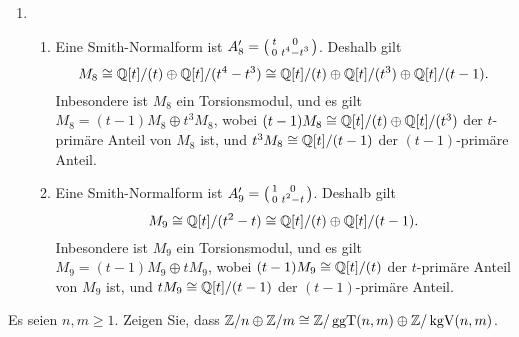 \begin{solution}
\begin{enumerate}
\begin{enumerate}
      \end{enumerate}
    \item
      \begin{enumerate}
        \item
          Eine Smith-Normalform ist $A_8' = \begin{psmallmatrix} t & 0 \\ 0 & t^4-t^3 \end{psmallmatrix}$.
          Deshalb gilt
          \[
                  M_8
            \cong \mathbb{Q}[t]/(t) \oplus \mathbb{Q}[t]/(t^4 - t^3)
            \cong \mathbb{Q}[t]/(t)  \oplus \mathbb{Q}[t]/(t^3) \oplus \mathbb{Q}[t]/(t-1).
          \]
          Inbesondere ist $M_8$ ein Torsionsmodul, und es gilt $M_8 = (t-1) M_8 \oplus t^3 M_8$, wobei $(t-1) M_8 \cong \mathbb{Q}[t]/(t) \oplus \mathbb{Q}[t]/(t^3)$ der $t$-primäre Anteil von $M_8$ ist, und $t^3 M_8 \cong \mathbb{Q}[t]/(t-1)$ der $(t-1)$-primäre Anteil.
        \item
          Eine Smith-Normalform ist $A_9' = \begin{psmallmatrix} 1 & 0 \\ 0 & t^2 - t \end{psmallmatrix}$.
          Deshalb gilt
          \[
                  M_9
            \cong \mathbb{Q}[t]/(t^2 - t)
            \cong \mathbb{Q}[t]/(t) \oplus \mathbb{Q}[t]/(t-1).
          \]
          Inbesondere ist $M_9$ ein Torsionsmodul, und es gilt $M_9 = (t-1) M_9 \oplus t M_9$, wobei $(t-1) M_9 \cong \mathbb{Q}[t]/(t)$ der $t$-primäre Anteil von $M_9$ ist, und $t M_9 \cong \mathbb{Q}[t]/(t-1)$ der $(t-1)$-primäre Anteil.
      \end{enumerate}
  \end{enumerate}
\end{solution}


\begin{question}[subtitle = Eine Isomorphie von abelschen Gruppen]
  Es seien $n, m \geq 1$.
  Zeigen Sie, dass $\mathbb{Z}/n \oplus \mathbb{Z}/m \cong \mathbb{Z}/\operatorname{ggT}(n,m) \oplus \mathbb{Z}/\operatorname{kgV}(n,m)$.
\end{question}


